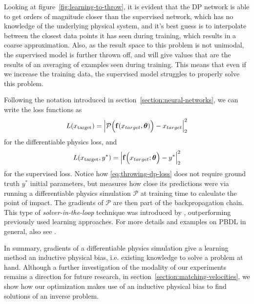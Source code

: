 Looking at figure~\ref{fig:learning-to-throw}, it is evident that the DP network
is able to get orders of magnitude closer than the supervised network, which has
no knowledge of the underlying physical system, and it's best guess is to
interpolate between the closest data points it has seen during training, which
results in a coarse approximation. Also, as the result space to this problem is
not unimodal, the supervised model is further thrown off, and will give values
that are the results of an averaging of examples seen during training. This
means that even if we increase the training data, the supervised model struggles
to properly solve this problem.  

Following the notation introduced in section~\ref{section:neural-networks}, we
can write the loss functions as
\begin{equation}\label{eq:throwing-dp-loss}
  L(x_{\text{target}}) = 
  \abs{\mathcal{P}\Big(\vb{f}(x_{target},\boldsymbol{\theta})\Big) - x_{target}}_2^2
\end{equation}
for the differentiable physics loss, and 
\begin{equation}\label{eq:throwing-supervised-loss}
  L(x_{\text{target}}, y^*) = 
  \abs{\vb{f}\Big(x_{target};\boldsymbol{\theta}\Big)-y^*}_2^2
\end{equation}
for the supervised loss. Notice how \eqref{eq:throwing-dp-loss} does not require
ground truth $y^*$ initial parameters, but measures how close its predictions
were via running a differentiable physics simulation $\mathcal{P}$ at training
time to calculate the point of impact. The gradients of $\mathcal{P}$ are then
part of the backpropagation chain. This type of \textit{solver-in-the-loop}
technique was introduced by \citet{solver-in-the-loop}, outperforming previously
used learning approaches. For more details and examples on \acf{PBDL} in general,
also see \citet{pbdl}.

In summary, gradients of a differentiable physics simulation give a learning
method an inductive physical bias, i.e. existing knowledge to solve a problem at
hand. Although a further investigation of the modality of our experiments
remains a direction for future research, in
section~\ref{section:matching-velocities}, we show how our optimization makes
use of an inductive physical bias to find solutions of an inverse problem.

